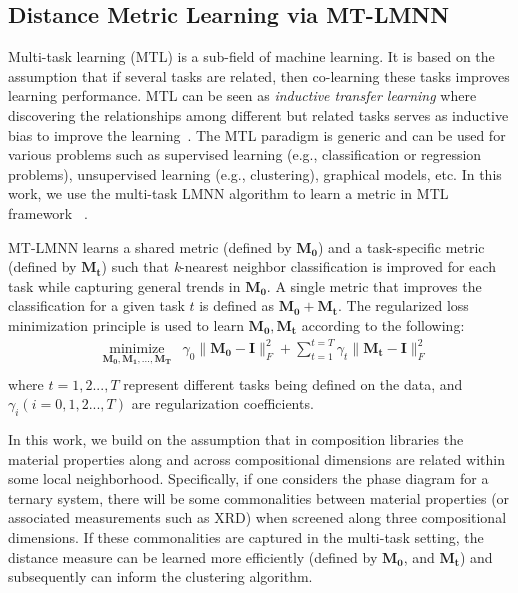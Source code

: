 \subsection{Distance Metric Learning via MT-LMNN}
Multi-task learning (MTL) is a sub-field of machine learning. It is based on the assumption that if several tasks are related, then co-learning these tasks improves learning performance. 
MTL can be seen as \textit{inductive transfer learning} where discovering the relationships among different but related tasks serves as inductive bias to improve the learning~\cite{caruana1997multitask}. 
The MTL paradigm is generic and can be used for various problems such as supervised learning (e.g., classification or regression problems), unsupervised learning (e.g., clustering), graphical models, etc.
In this work, we use the multi-task LMNN algorithm to learn a metric in MTL framework ~\cite{parameswaran2010large}. 

MT-LMNN learns a shared metric (defined by \(\mathbf{M_0}\)) and a task-specific metric (defined by \(\mathbf{M_t}\)) such that \textit{k}-nearest neighbor classification is improved for each task while capturing general trends in \(\mathbf{M_0}\). A single metric that improves the classification for a given task $t$ is defined as \(\mathbf{M_{0} + M_{t}}\).
The regularized loss minimization principle is used to learn  \(\mathbf{M_0}, \mathbf{M_t}\) according to the following:
\begin{equation}
\begin{aligned}
& \underset{\mathbf{M_0,M_1,...,M_T}}{\text{minimize}} &\gamma_0\lVert \mathbf{{M_0-I}} \rVert ^2_F+ \sum_{t=1}^{t=T} \gamma_t \lVert \mathbf{{M_t-I}} \rVert ^2_F\\
\end{aligned}  
\label{regM}
\end{equation}
where $t=1,2...,T$ represent different tasks being defined on the data, and $\gamma_i (i=0,1,2...,T)$ are regularization coefficients. 

In this work, we build on the assumption that in composition libraries the material properties along and across compositional dimensions are related within some local neighborhood. 
Specifically, if one considers the phase diagram for a ternary system, there will be some commonalities between material properties (or associated measurements such as XRD) when screened along three compositional dimensions.
If these commonalities are captured in the multi-task setting, the distance measure can be learned more efficiently (defined by \(\mathbf{M_0}\), and \(\mathbf{M_t}\)) and subsequently can inform the clustering algorithm.

